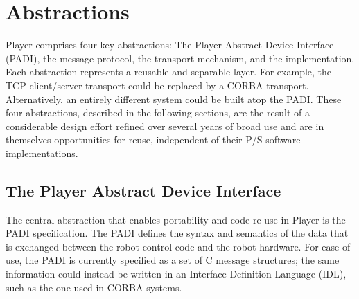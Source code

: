 \section{Abstractions}
Player comprises four key abstractions: The Player Abstract Device
Interface (PADI), the message protocol, the transport mechanism, and
the implementation.  Each abstraction represents a reusable and
separable layer.  For example, the TCP client/server transport could
be replaced by a CORBA transport.  Alternatively, an entirely
different system could be built atop the PADI.  These four
abstractions, described in the following sections, are the result of a
considerable design effort refined over several years of broad use
and are in themselves opportunities for reuse, independent of their
P/S software implementations.


\subsection{The Player Abstract Device Interface}

The central abstraction that enables portability and code re-use in
Player is the PADI specification. The PADI defines the syntax and
semantics of the data that is exchanged between the robot control code
and the robot hardware.  For ease of use, the PADI is currently
specified as a set of C message structures; the same information could
instead be written in an Interface Definition Language (IDL), such as
the one used in CORBA systems.

